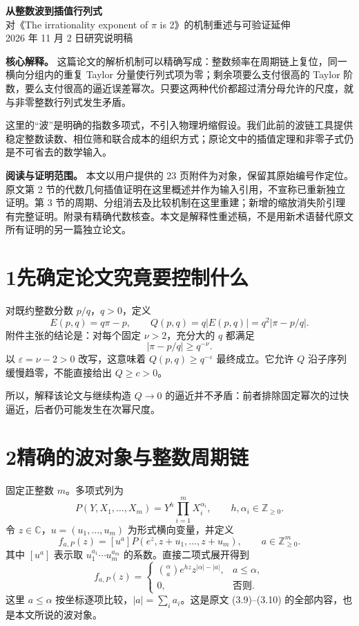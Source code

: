 \documentclass[11pt,a4paper]{article}
\begin{document}
\begin{center}
{\LARGE\bfseries 从整数波到插值行列式}\\[5pt]
{\large 对《The irrationality exponent of $\pi$ is 2》的机制重述与可验证延伸}\\[8pt]
2026 年 11 月 2 日\quad 研究说明稿
\end{center}

\textbf{核心解释。} 这篇论文的解析机制可以精确写成：整数频率在周期链上复位，同一横向分组内的重复 Taylor 分量使行列式项为零；剩余项要么支付很高的 Taylor 阶数，要么支付很高的逼近误差幂次。只要这两种代价都超过清分母允许的尺度，就与非零整数行列式发生矛盾。

这里的“波”是明确的指数多项式，不引入物理坍缩假设。我们此前的波链工具提供稳定整数读数、相位筛和联合成本的组织方式；原论文中的插值定理和非零子式仍是不可省去的数学输入。

\textbf{阅读与证明范围。} 本文以用户提供的 23 页附件为对象，保留其原始编号作定位。原文第 2 节的代数几何插值证明在这里概述并作为输入引用，不宣称已重新独立证明。第 3 节的周期、分组消去及比较机制在这里重建；新增的缩放消失阶引理有完整证明。附录有精确代数核查。本文是解释性重述稿，不是用新术语替代原文所有证明的另一篇独立论文。

\section*{1\quad 先确定论文究竟要控制什么}
对既约整数分数 $p/q$，$q>0$，定义
\[
 E(p,q)=q\pi-p,\qquad Q(p,q)=q|E(p,q)|=q^2|\pi-p/q|.
\]
附件主张的结论是：对每个固定 $\nu>2$，充分大的 $q$ 都满足
\[
 |\pi-p/q|\ge q^{-\nu}.
\]
以 $\varepsilon=\nu-2>0$ 改写，这意味着 $Q(p,q)\ge q^{-\varepsilon}$ 最终成立。它允许 $Q$ 沿子序列缓慢趋零，不能直接给出 $Q\ge c>0$。

所以，解释该论文与继续构造 $Q\to0$ 的逼近并不矛盾：前者排除固定幂次的过快逼近，后者仍可能发生在次幂尺度。

\newpage
\section*{2\quad 精确的波对象与整数周期链}
固定正整数 $m$。多项式列为
\[
 P(Y,X_1,\ldots,X_m)=Y^h\prod_{i=1}^mX_i^{\alpha_i},
 \qquad h,\alpha_i\in\mathbb Z_{\ge0}.
\]
令 $z\in\mathbb C$，$u=(u_1,\ldots,u_m)$ 为形式横向变量，并定义
\[
 f_{a,P}(z)=[u^a]P(e^z,z+u_1,\ldots,z+u_m),
 \qquad a\in\mathbb Z_{\ge0}^m.
\]
其中 $[u^a]$ 表示取 $u_1^{a_1}\cdots u_m^{a_m}$ 的系数。直接二项式展开得到
\[
 f_{a,P}(z)=
 \begin{cases}
 \displaystyle\binom{\alpha}{a} e^{hz}z^{|\alpha|-|a|},&a\le\alpha,\\
 0,&\text{否则}.
 \end{cases}
\]
这里 $a\le\alpha$ 按坐标逐项比较，$|a|=\sum_i a_i$。这是原文 (3.9)--(3.10) 的全部内容，也是本文所说的波对象。
\end{document}
